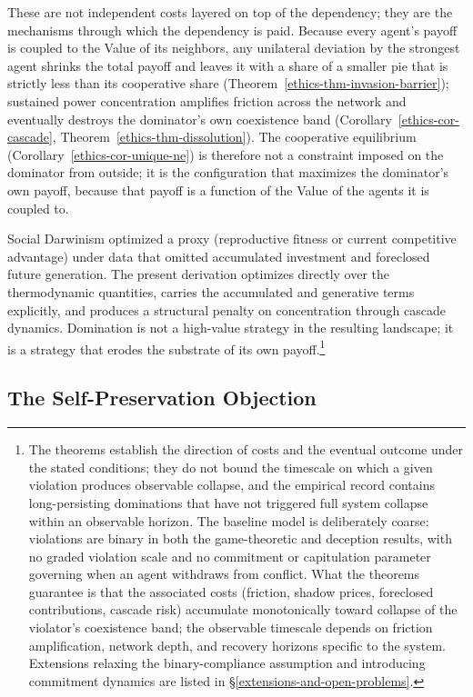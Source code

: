 \documentclass[11pt]{article}
\theoremstyle{plain}
\theoremstyle{definition}
\theoremstyle{remark}
\let\origsubsection\subsection
\renewcommand{\subsection}{\needspace{7\baselineskip}\origsubsection}
\begin{document}
These are not independent costs layered on top of the dependency; they
are the mechanisms through which the dependency is paid. Because every
agent's payoff is coupled to the Value of its neighbors, any unilateral
deviation by the strongest agent shrinks the total payoff and leaves it
with a share of a smaller pie that is strictly less than its cooperative
share (Theorem~\ref{ethics-thm-invasion-barrier}); sustained power
concentration amplifies friction across the network and eventually
destroys the dominator's own coexistence band
(Corollary~\ref{ethics-cor-cascade},
Theorem~\ref{ethics-thm-dissolution}). The cooperative equilibrium
(Corollary~\ref{ethics-cor-unique-ne}) is therefore not a constraint
imposed on the dominator from outside; it is the configuration that
maximizes the dominator's own payoff, because that payoff is a function
of the Value of the agents it is coupled to.

Social Darwinism optimized a proxy (reproductive fitness or current
competitive advantage) under data that omitted accumulated investment
and foreclosed future generation. The present derivation optimizes
directly over the thermodynamic quantities, carries the accumulated and
generative terms explicitly, and produces a structural penalty on
concentration through cascade dynamics. Domination is not a high-value
strategy in the resulting landscape; it is a strategy that erodes the
substrate of its own payoff.\footnote{The theorems establish the
  direction of costs and the eventual outcome under the stated
  conditions; they do not bound the timescale on which a given violation
  produces observable collapse, and the empirical record contains
  long-persisting dominations that have not triggered full system
  collapse within an observable horizon. The baseline model is
  deliberately coarse: violations are binary in both the game-theoretic
  and deception results, with no graded violation scale and no
  commitment or capitulation parameter governing when an agent withdraws
  from conflict. What the theorems guarantee is that the associated
  costs (friction, shadow prices, foreclosed contributions, cascade
  risk) accumulate monotonically toward collapse of the violator's
  coexistence band; the observable timescale depends on friction
  amplification, network depth, and recovery horizons specific to the
  system. Extensions relaxing the binary-compliance assumption and
  introducing commitment dynamics are listed in
  §\ref{extensions-and-open-problems}.}

\subsection{The Self-Preservation
Objection}\label{the-self-preservation-objection}
\end{document}

